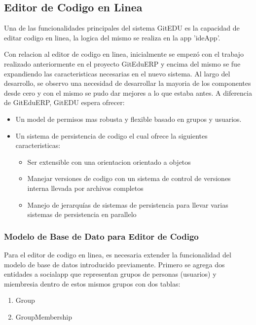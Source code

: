 \subsection{Editor de Codigo en Linea}
Una de las funcionalidades principales del sistema GitEDU es la capacidad de editar codigo en linea, la logica del mismo se realiza en la app 'ideApp'.

Con relacion al editor de codigo en linea, inicialmente se empezó con el trabajo realizado anteriormente en el proyecto GitEduERP y encima del mismo se fue expandiendo las caracteristicas necesarias en el nuevo sistema. Al largo del desarrollo, se observo una necesidad de desarrollar la mayoria de los componentes desde cero y con el mismo se pudo dar mejores a lo que estaba antes. A diferencia de GitEduERP, GitEDU espera ofrecer:
\begin{itemize}
  \item Un model de permisos mas robusta y flexible basado en grupos y usuarios.
  \item Un sistema de persistencia de codigo el cual ofrece la siguientes caracteristicas:
    \begin{itemize}
      \item Ser extensible con una orientacion orientado a objetos
      \item Manejar versiones de codigo con un sistema de control de versiones interna llevada por archivos completos
      \item Manejo de jerarquías de sistemas de persistencia para llevar varias sistemas de persistencia en parallelo
    \end{itemize}
\end{itemize}

\subsubsection{Modelo de Base de Dato para Editor de Codigo}
Para el editor de codigo en linea, es necesaria extender la funcionalidad del modelo de base de datos introducido previamente. Primero se agrega dos entidades a socialapp que representan grupos de personas (usuarios) y miembresia dentro de estos mismos grupos con dos tablas:
\begin{enumerate}
\item Group
\item GroupMembership
\end{enumerate}

